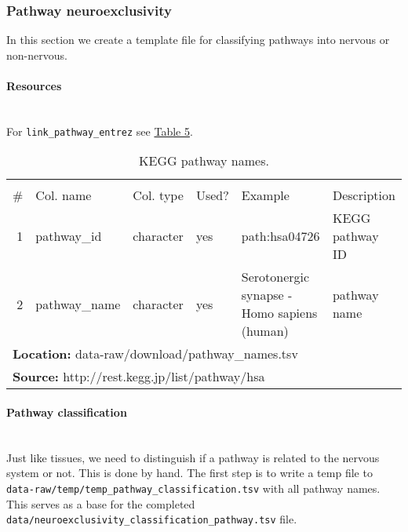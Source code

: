 \hypertarget{pathway-neuroexclusivity}{%
\subsubsection{Pathway
neuroexclusivity}\label{pathway-neuroexclusivity}}

In this section we create a template file for classifying pathways into
nervous or non-nervous.

\hypertarget{resources-1}{%
\paragraph{\texorpdfstring{\textbf{Resources}}{Resources}}\label{resources-1}}

\texttt{}\\
For \texttt{link\_pathway\_entrez} see
\hyperref[tab:link_pathway_entrez]{Table 5}.

\begin{table}[H]

\caption{\label{tab:pathway_names}KEGG pathway names.}
\begin{tabular}[t]{rlllll}
\toprule
\multicolumn{6}{c}{\bgroup\fontsize{12}{14}\selectfont \cellcolor[HTML]{EEEEEE}{\ttfamily{\textbf{pathway\_names}}}\egroup{}} \\
\cmidrule(l{3pt}r{3pt}){1-6}
\# & Col. name & Col. type & Used? & Example & Description\\
\midrule
\rowcolor{gray!6}  1 & pathway\_id & character & yes & path:hsa04726 & KEGG pathway ID\\
2 & pathway\_name & character & yes & Serotonergic synapse - Homo sapiens (human) & pathway name\\
\bottomrule
\multicolumn{6}{l}{\textbf{Location: } data-raw/download/pathway\_names.tsv}\\
\multicolumn{6}{l}{\textbf{Source: } http://rest.kegg.jp/list/pathway/hsa}\\
\end{tabular}
\end{table}

\hypertarget{pathway-classification}{%
\paragraph{\texorpdfstring{\textbf{Pathway
classification}}{Pathway classification}}\label{pathway-classification}}

\texttt{}\\
Just like tissues, we need to distinguish if a pathway is related to the
nervous system or not. This is done by hand. The first step is to write
a temp file to \texttt{data-raw/temp/temp\_pathway\_classification.tsv}
with all pathway names. This serves as a base for the completed
\texttt{data/neuroexclusivity\_classification\_pathway.tsv} file.

